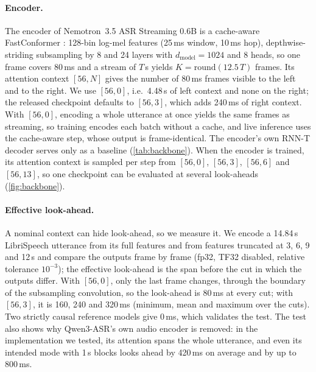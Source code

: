 \paragraph{Encoder.}
The encoder of Nemotron~3.5 ASR Streaming 0.6B \citep{nvidia2026nemotron35asr} is a cache-aware FastConformer \citep{gulati2020conformer,rekesh2023fast,noroozi2024stateful}: 128-bin log-mel features (25\,ms window, 10\,ms hop), depthwise-striding subsampling by 8 and 24 layers with $d_{\mathrm{model}}=1024$ and 8 heads, so one frame covers 80\,ms and a stream of $T$\,s yields $K=\mathrm{round}(12.5\,T)$ frames. Its attention context $[56,N]$ gives the number of 80\,ms frames visible to the left and to the right. We use $[56,0]$, i.e.\ 4.48\,s of left context and none on the right; the released checkpoint defaults to $[56,3]$, which adds 240\,ms of right context. With $[56,0]$, encoding a whole utterance at once yields the same frames as streaming, so training encodes each batch without a cache, and live inference uses the cache-aware step, whose output is frame-identical. The encoder's own RNN-T decoder \citep{graves2012sequence} serves only as a baseline (\cref{tab:backbone}). When the encoder is trained, its attention context is sampled per step from $[56,0]$, $[56,3]$, $[56,6]$ and $[56,13]$, so one checkpoint can be evaluated at several look-aheads (\cref{fig:backbone}).

\paragraph{Effective look-ahead.}
A nominal context can hide look-ahead, so we measure it. We encode a 14.84\,s LibriSpeech \citep{panayotov2015librispeech} utterance from its full features and from features truncated at 3, 6, 9 and 12\,s and compare the outputs frame by frame (fp32, TF32 disabled, relative tolerance $10^{-3}$); the effective look-ahead is the span before the cut in which the outputs differ. With $[56,0]$, only the last frame changes, through the boundary of the subsampling convolution, so the look-ahead is 80\,ms at every cut; with $[56,3]$, it is 160, 240 and 320\,ms (minimum, mean and maximum over the cuts). Two strictly causal reference models give 0\,ms, which validates the test. The test also shows why Qwen3-ASR's own audio encoder is removed: in the implementation we tested, its attention spans the whole utterance, and even its intended mode with 1\,s blocks looks ahead by 420\,ms on average and by up to 800\,ms.

